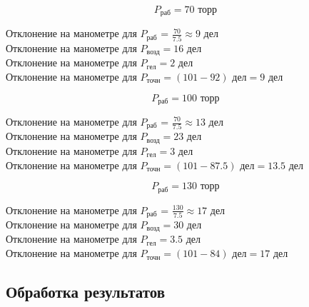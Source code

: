 \documentclass[a4paper]{article}
\begin{document}

\[P_\text{раб} = 70 \text{ торр}  \]

Отклонение на манометре для $P_\text{раб}$ = $\frac{70}{7.5} \approx 9 \text{ дел}$ \\

Отклонение на манометре для $P_\text{возд} = 16 \text{ дел}$ \\

Отклонение на манометре для $P_\text{гел} = 2 \text{ дел}$ \\

Отклонение на манометре для $P_\text{точн} = (101 - 92) \text{ дел} = 9 \text{ дел}$


\[P_\text{раб} = 100 \text{ торр}  \]

Отклонение на манометре для $P_\text{раб}$ = $\frac{70}{7.5} \approx 13 \text{ дел}$ \\

Отклонение на манометре для $P_\text{возд} = 23 \text{ дел}$ \\

Отклонение на манометре для $P_\text{гел} = 3 \text{ дел}$ \\

Отклонение на манометре для $P_\text{точн} = (101 - 87.5) \text{ дел} = 13.5 \text{ дел}$


\[P_\text{раб} = 130 \text{ торр}  \]

Отклонение на манометре для $P_\text{раб}$ = $\frac{130}{7.5} \approx 17 \text{ дел}$ \\

Отклонение на манометре для $P_\text{возд} = 30 \text{ дел}$ \\

Отклонение на манометре для $P_\text{гел} = 3.5 \text{ дел}$ \\

Отклонение на манометре для $P_\text{точн} = (101 - 84) \text{ дел} = 17 \text{ дел}$


\subsection{Обработка результатов}
\end{document}
